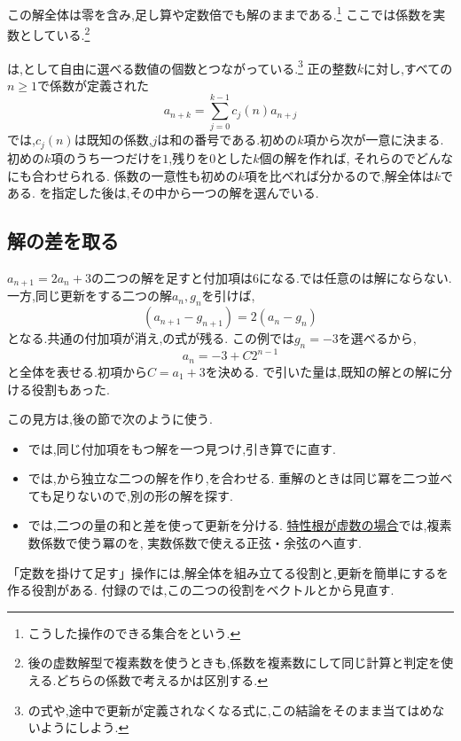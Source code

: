     この解全体は零を含み,足し算や定数倍でも解のままである.\footnote{こうした操作のできる集合を\textbf{}という.}
    ここでは係数を実数としている.\footnote{後の虚数解型で複素数を使うときも,係数を複素数にして同じ計算と判定を使える.どちらの係数で考えるかは区別する.}

    は,として自由に選べる数値の個数とつながっている.\footnote{の式や,途中で更新が定義されなくなる式に,この結論をそのまま当てはめないようにしよう.}
    正の整数$k$に対し,すべての$n\ge1$で係数が定義された
    \[
      a_{n+k}=\sum_{j=0}^{k-1}c_j(n)a_{n+j}
    \]
    では,$c_j(n)$は既知の係数,$j$は和の番号である.初めの$k$項から次が一意に決まる.
    初めの$k$項のうち一つだけを$1$,残りを$0$とした$k$個の解を作れば,
    それらのでどんなにも合わせられる.
    係数の一意性も初めの$k$項を比べれば分かるので,解全体は$k$である.
    を指定した後は,その中から一つの解を選んでいる.

  \subsection{解の差を取る}\label{節：非同次と解の組合せ}
    $a_{n+1}=2a_n+3$の二つの解を足すと付加項は$6$になる.では任意のは解にならない.
    一方,同じ更新をする二つの解$a_n,g_n$を引けば,
    \[
      (a_{n+1}-g_{n+1})=2(a_n-g_n)
    \]
    となる.共通の付加項が消え,の式が残る.
    この例では$g_n=-3$を選べるから,
    \[
      a_n=-3+C2^{n-1}
    \]
    と全体を表せる.初項から$C=a_1+3$を決める.
    で引いた量は,既知の解との解に分ける役割もあった.

    この見方は,後の節で次のように使う.
    \begin{itemize}
      \item {}では,同じ付加項をもつ解を一つ見つけ,引き算でに直す.
      \item {}では,から独立な二つの解を作り,を合わせる.
            重解のときは同じ冪を二つ並べても足りないので,別の形の解を探す.
      \item {}では,二つの量の和と差を使って更新を分ける.
            \hyperref[節：虚数解型隣接3項間漸化式]{特性根が虚数の場合}では,複素数係数で使う冪のを,
            実数係数で使える正弦・余弦のへ直す.
    \end{itemize}
    「定数を掛けて足す」操作には,解全体を組み立てる役割と,更新を簡単にするを作る役割がある.
    付録のでは,この二つの役割をベクトルとから見直す.
